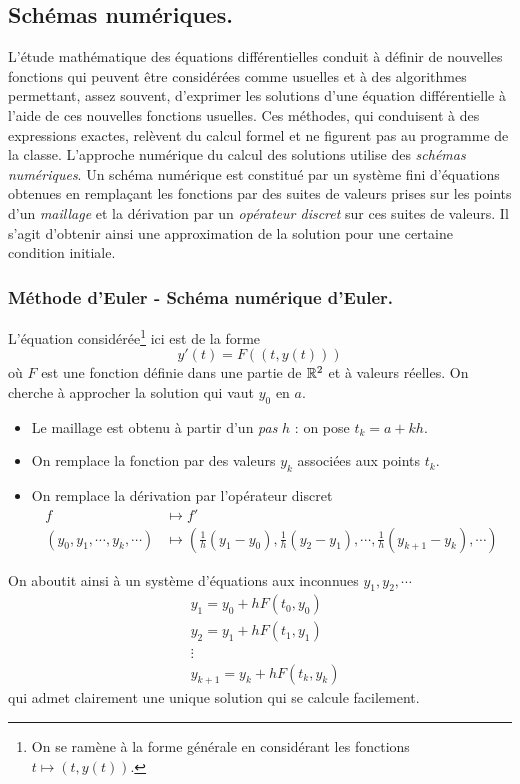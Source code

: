 \subsection{Schémas numériques.}
L'étude mathématique des équations différentielles conduit à définir de nouvelles fonctions qui peuvent être considérées comme usuelles et à des algorithmes permettant, assez souvent, d'exprimer les solutions d'une équation différentielle à l'aide de ces nouvelles fonctions usuelles. Ces méthodes, qui conduisent à des expressions exactes, relèvent du calcul formel et ne figurent pas au programme de la classe.\newline
L'approche numérique du calcul des solutions utilise des \emph{schémas numériques}. Un schéma numérique est constitué par un système fini d'équations obtenues en remplaçant les fonctions par des suites de valeurs prises sur les points d'un \emph{maillage} et la dérivation par un \emph{opérateur discret} sur ces suites de valeurs. Il s'agit d'obtenir ainsi une approximation de la solution pour une certaine condition initiale.
\subsubsection{Méthode d'Euler - Schéma numérique d'Euler.}
L'équation considérée\footnote{On se ramène à la forme générale en considérant les fonctions $t\mapsto (t,y(t))$.} ici est de la forme
\begin{equation}
  y'(t) = F((t,y(t)))
  \label{euler}
\end{equation}
où $F$ est une fonction définie dans une partie de $\mathbb{R}^2$ et à valeurs réelles. On cherche à approcher la solution qui vaut $y_0$ en $a$.
\begin{itemize}
  \item Le maillage est obtenu à partir d'un  \emph{pas} $h$ : on pose $t_k = a + kh$.
  \item On remplace la fonction par des valeurs $y_k$ associées aux points $t_k$.
  \item On remplace la dérivation par l'opérateur discret 
  \begin{align*}
  f &\mapsto f'\\
(y_0,y_1,\cdots,y_k,\cdots)&\mapsto \left(\frac{1}{h}(y_1-y_0), \frac{1}{h}(y_2-y_1),\cdots, \frac{1}{h}(y_{k+1}-y_k),\cdots \right)      
  \end{align*}
\end{itemize}
On aboutit ainsi à un système d'équations aux inconnues $y_1,y_2,\cdots$
\begin{align*}
  &y_1 = y_0 + hF(t_0,y_0) \\ &y_2 = y_1 + hF(t_1,y_1)\\ &\vdots \\ &y_{k+1} = y_k + hF(t_k,y_k)
\end{align*}
qui admet clairement une unique solution qui se calcule facilement.

